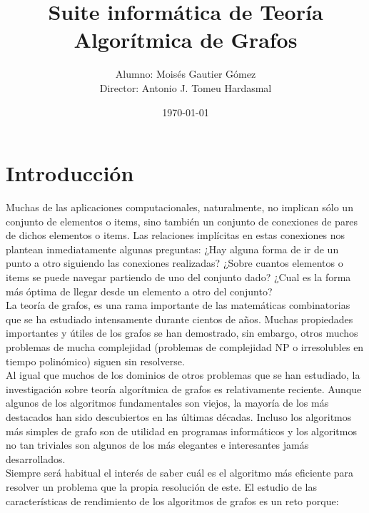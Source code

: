 \documentclass[a4paper,12pt]{article}
\title{Suite informática de Teoría Algorítmica de Grafos}
\author{Alumno: Moisés Gautier Gómez\\Director: Antonio J. Tomeu Hardasmal}
\date{\today}
\begin{document}


\maketitle
\pagestyle{empty}

\tableofcontents 

\cleardoublepage
\pagestyle{plain}
\section{Introducción}

Muchas de las aplicaciones computacionales, naturalmente, no implican sólo un conjunto de elementos o items, sino también un conjunto de conexiones de pares de dichos elementos o items. Las relaciones implícitas en estas conexiones nos plantean inmediatamente algunas preguntas: ¿Hay alguna forma de ir de un punto a otro siguiendo las conexiones realizadas? ¿Sobre cuantos elementos o items se puede navegar partiendo de uno del conjunto dado? ¿Cual es la forma más óptima de llegar desde un elemento a otro del conjunto?\\

La teoría de grafos, es una rama importante de las matemáticas combinatorias que se ha estudiado intensamente durante cientos de años. Muchas propiedades importantes y útiles de los grafos se han demostrado, sin embargo, otros muchos problemas de mucha complejidad (problemas de complejidad NP o irresolubles en tiempo polinómico) siguen sin resolverse.\\

Al igual que muchos de los dominios de otros problemas que se han estudiado, la investigación sobre teoría algorítmica de grafos es relativamente reciente. Aunque algunos de los algoritmos fundamentales son viejos, la mayoría de los más destacados han sido descubiertos en las últimas décadas. Incluso los algoritmos más simples de grafo son de utilidad en programas informáticos y los algoritmos no tan triviales son algunos de los más elegantes e interesantes jamás desarrollados.\\

Siempre será habitual el interés de saber cuál es el algoritmo más eficiente para resolver un problema que la propia resolución de este. El estudio de las características de rendimiento de los algoritmos de grafos es un reto porque:\\
\end{document}
